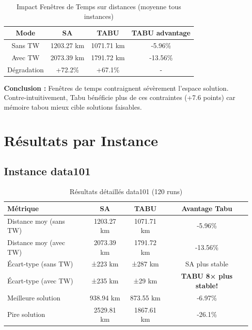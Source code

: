 \documentclass[12pt,a4paper,twoside]{report}
\begin{document}
\begin{table}[H]
    \centering
    \caption{Impact Fenêtres de Temps sur distances (moyenne tous instances)}
    \begin{tabular}{|c|c|c|c|}
        \hline
        \textbf{Mode} & \textbf{SA} & \textbf{TABU} & \textbf{TABU advantage} \\
        \hline
        Sans TW       & 1203.27 km  & 1071.71 km    & -5.96\%                 \\
        Avec TW       & 2073.39 km  & 1791.72 km    & -13.56\%                \\
        \hline
        Dégradation   & +72.2\%     & +67.1\%       & -                       \\
        \hline
    \end{tabular}
\end{table}

\textbf{Conclusion :} Fenêtres de temps contraignent sévèrement l'espace solution. Contre-intuitivement, Tabu bénéficie plus de ces contraintes (+7.6 points) car mémoire tabou mieux cible solutions faisables.

\section{Résultats par Instance}

\subsection{Instance data101}

\begin{table}[H]
    \centering
    \caption{Résultats détaillés data101 (120 runs)}
    \begin{tabular}{|l|c|c|c|}
        \hline
        \textbf{Métrique}      & \textbf{SA} & \textbf{TABU} & \textbf{Avantage Tabu}        \\
        \hline
        Distance moy (sans TW) & 1203.27 km  & 1071.71 km    & -5.96\%                       \\
        Distance moy (avec TW) & 2073.39 km  & 1791.72 km    & -13.56\%                      \\
        Écart-type (sans TW)   & ±223 km     & ±287 km       & SA plus stable                \\
        Écart-type (avec TW)   & ±235 km     & ±29 km        & \textbf{TABU 8× plus stable!} \\
        Meilleure solution     & 938.94 km   & 873.55 km     & -6.97\%                       \\
        Pire solution          & 2529.81 km  & 1867.61 km    & -26.1\%                       \\
        \hline
    \end{tabular}
\end{table}
\end{document}
